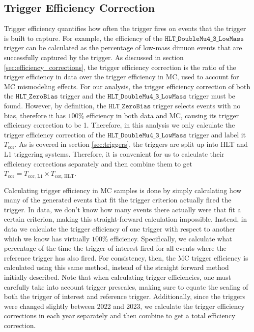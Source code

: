 \subsection{Trigger Efficiency Correction}
\label{subsec:trigger_efficency_correction}

Trigger efficiency quantifies how often the trigger fires on events that the trigger is built to capture. For example, the efficiency of the $\texttt{HLT\_DoubleMu4\_3\_LowMass}$ trigger can be calculated as the percentage of low-mass dimuon events that are successfully captured by the trigger. As discussed in section \ref{sec:efficiency_corrections}, the trigger efficiency correction is the ratio of the trigger efficiency in data over the trigger efficiency in MC, used to account for MC mismodeling effects. For our analysis, the trigger efficiency correction of both the $\texttt{HLT\_ZeroBias}$ trigger and the $\texttt{HLT\_DoubleMu4\_3\_LowMass}$ trigger must be found. However, by definition, the $\texttt{HLT\_ZeroBias}$ trigger selects events with no bias, therefore it has $100\%$ efficiency in both data and MC, causing its trigger efficiency correction to be 1. Therefore, in this analysis we only calculate the trigger efficiency correction of the $\texttt{HLT\_DoubleMu4\_3\_LowMass}$ trigger and label it $T_{\text{cor}}$. As is covered in section \ref{sec:triggers}, the triggers are split up into HLT and L1 triggering systems. Therefore, it is convenient for us to calculate their efficiency corrections separately and then combine them to get $T_{\text{cor}} = T_{\text{cor, L1}} \times T_{\text{cor, HLT}}$.

Calculating trigger efficiency in MC samples is done by simply calculating how many of the generated events that fit the trigger criterion actually fired the trigger. In data, we don't know how many events there actually were that fit a certain criterion, making this straight-forward calculation impossible. Instead, in data we calculate the trigger efficiency of one trigger with respect to another which we know has virtually $100\%$ efficiency. Specifically, we calculate what percentage of the time the trigger of interest fired for all events where the reference trigger has also fired. For consistency, then, the MC trigger efficiency is calculated using this same method, instead of the straight forward method initially described. Note that when calculating trigger efficiencies, one must carefully take into account trigger prescales, making sure to equate the scaling of both the trigger of interest and reference trigger. Additionally, since the triggers were changed slightly between 2022 and 2023, we calculate the trigger efficiency corrections in each year separately and then combine to get a total efficiency correction.

